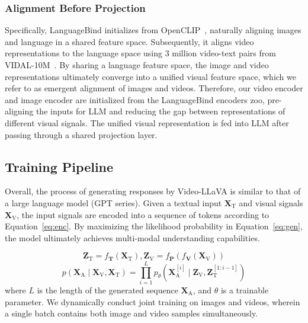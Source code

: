 \subsubsection{Alignment Before Projection}
Specifically, LanguageBind initializes from OpenCLIP~\cite{ilharco_gabriel_2021_5143773}, naturally aligning images and language in a shared feature space. Subsequently, it aligns video representations to the language space using 3 million video-text pairs from VIDAL-10M~\cite{zhu2023languagebind}. By sharing a language feature space, the image and video representations ultimately converge into a unified visual feature space, which we refer to as emergent alignment of images and videos. Therefore, our video encoder and image encoder are initialized from the LanguageBind encoders zoo, pre-aligning the inputs for LLM and reducing the gap between representations of different visual signals. The unified visual representation is fed into LLM after passing through a shared projection layer.

\subsection{Training Pipeline}
Overall, the process of generating responses by Video-LLaVA is similar to that of a large language model (GPT series). Given a textual input $\mathbf{X}_{\text{T}}$ and visual signals $\mathbf{X}_{\text{V}}$, the input signals are encoded into a sequence of tokens according to Equation~\ref{eq:enc}. By maximizing the likelihood probability in Equation~\ref{eq:gen}, the model ultimately achieves multi-modal understanding capabilities.

\begin{equation}
    \mathbf{Z}_{\text{T}}=f_{\mathbf{T}}\left(\mathbf{X}_{\text{T}}\right), 
    \mathbf{Z}_{\text{V}}=f_{\mathbf{P}}\left(f_{\mathbf{V}}\left(\mathbf{X}_{\text{V}}\right)\right)
  \label{eq:enc}
\end{equation}
\begin{equation}
  p\left(\mathbf{X}_{\text{A}} \mid \mathbf{X}_{\text{V}},\mathbf{X}_{\text{T}}\right)=\prod_{i=1}^L p_\theta\left(\mathbf{X}_{\text{A}}^{[i]} \mid \mathbf{Z}_{\text{V}}, \mathbf{Z}_{\text{T}}^{[1: i-1]}\right)
  \label{eq:gen}
\end{equation}
where $L$ is the length of the generated sequence $\mathbf{X}_{\text{A}}$, and $\theta$ is a trainable parameter. We dynamically conduct joint training on images and videos, wherein a single batch contains both image and video samples simultaneously.

